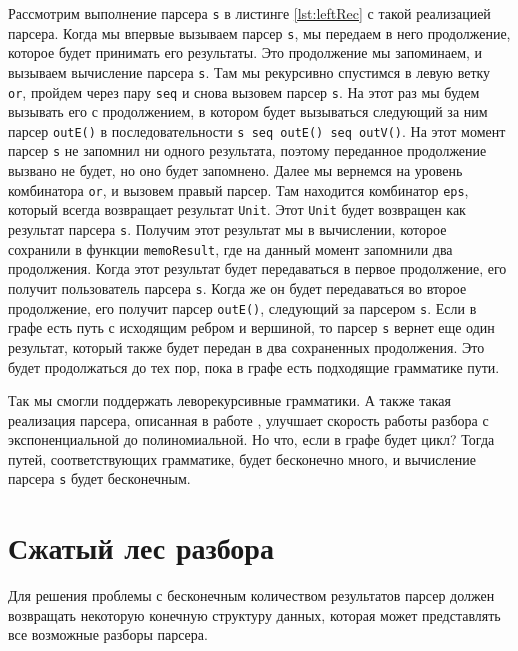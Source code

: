 Рассмотрим выполнение парсера \texttt{s} в листинге \ref{lst:leftRec} с такой реализацией парсера.
Когда мы впервые вызываем парсер \texttt{s}, мы передаем в него продолжение, которое будет принимать его результаты.
Это продолжение мы запоминаем, и вызываем вычисление парсера \texttt{s}.
Там мы рекурсивно спустимся в левую ветку \texttt{or}, пройдем через пару \texttt{seq} и снова вызовем парсер \texttt{s}.
На этот раз мы будем вызывать его с продолжением, в котором будет вызываться следующий за ним парсер \texttt{outE()} в последовательности \texttt{s seq outE() seq outV()}.
На этот момент парсер \texttt{s} не запомнил ни одного результата, поэтому переданное продолжение вызвано не будет, но оно будет запомнено.
Далее мы вернемся на уровень комбинатора \texttt{or}, и вызовем правый парсер.
Там находится комбинатор \texttt{eps}, который всегда возвращает результат \texttt{Unit}.
Этот \texttt{Unit} будет возвращен как результат парсера \texttt{s}.
Получим этот результат мы в вычислении, которое сохранили в функции \texttt{memoResult}, где на данный момент запомнили два продолжения.
Когда этот результат будет передаваться в первое продолжение, его получит пользователь парсера \texttt{s}.
Когда же он будет передаваться во второе продолжение, его получит парсер \texttt{outE()}, следующий за парсером \texttt{s}.
Если в графе есть путь с исходящим ребром и вершиной, то парсер \texttt{s} вернет еще один результат, который также будет передан в два сохраненных продолжения.
Это будет продолжаться до тех пор, пока в графе есть подходящие грамматике пути.

Так мы смогли поддержать леворекурсивные грамматики.
А также такая реализация парсера, описанная в работе \cite{MemoizationJohnson}, улучшает скорость работы разбора с экспоненциальной до полиномиальной.
Но что, если в графе будет цикл?
Тогда путей, соответствующих грамматике, будет бесконечно много, и вычисление парсера \texttt{s} будет бесконечным.

\section{Сжатый лес разбора}

Для решения проблемы с бесконечным количеством результатов парсер должен возвращать некоторую конечную структуру данных, которая может представлять все возможные разборы парсера.

